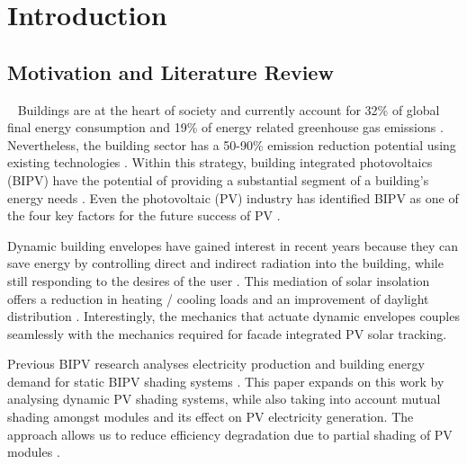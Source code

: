 \chapter{Introduction}


\section{Motivation and Literature Review}\
\label{ch:motivation}
	Buildings are at the heart of society and currently account for 32\% of global final energy consumption and 19\% of energy related greenhouse gas emissions \cite{IPCC}. Nevertheless, the building sector has a 50-90\% emission reduction potential using existing technologies \cite{IPCC}. Within this strategy, building integrated photovoltaics (BIPV) have the potential of providing a substantial segment of a building's energy needs \cite{defaix2012technical}. Even the photovoltaic (PV) industry has identified BIPV as one of the four key factors for the future success of PV \cite{raugei2009life}. 



	Dynamic building envelopes have gained interest in recent years because they can save energy by controlling direct and indirect radiation into the building, while still responding to the desires of the user \cite{loonen2013climate}. This mediation of solar insolation offers a reduction in heating / cooling loads and an improvement of daylight distribution \cite{rossi2012adaptive}. Interestingly, the mechanics that actuate dynamic envelopes couples seamlessly with the mechanics required for facade integrated PV solar tracking. 

	Previous BIPV research analyses electricity production and building energy demand for static BIPV shading systems \cite{mandalaki2012assessment} \cite{yoo2011available} \cite{freitas2015maximizing} \cite{jayathissa2015abs}. This paper expands on this work by analysing dynamic PV shading systems, while also taking into account mutual shading amongst modules and its effect on PV electricity generation. The approach allows us to reduce efficiency degradation due to partial shading of PV modules \cite{hofer2015PVSEC}.

